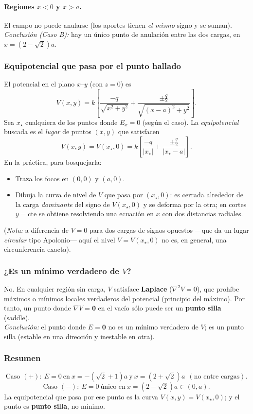 \documentclass{article}
\begin{document}
\paragraph{Regiones $x<0$ y $x>a$.} El campo no puede anularse (los aportes tienen \emph{el mismo} signo y se suman).\\[2pt]
\emph{Conclusión (Caso B):} hay un único punto de anulación entre las dos cargas, en $x=(2-\sqrt{2})a$.

\subsubsection*{Equipotencial que pasa por el punto hallado}
El potencial en el plano $x$–$y$ (con $z=0$) es
\[
V(x,y)=k\left[\frac{-q}{\sqrt{x^2+y^2}}+\frac{\pm \tfrac{q}{2}}{\sqrt{(x-a)^2+y^2}}\right].
\]
Sea $x_\star$ cualquiera de los puntos donde $E_x=0$ (según el caso). La \emph{equipotencial} buscada es el \emph{lugar} de puntos $(x,y)$ que satisfacen
\[
V(x,y)=V(x_\star,0)
= k\left[\frac{-q}{|x_\star|}+\frac{\pm \tfrac{q}{2}}{|x_\star-a|}\right].
\]
En la práctica, para bosquejarla:
\begin{itemize}
\item Traza los focos en $(0,0)$ y $(a,0)$.
\item Dibuja la curva de nivel de $V$ que pasa por $(x_\star,0)$: es cerrada alrededor de la carga \emph{dominante} del signo de $V(x_\star,0)$ y se deforma por la otra; en cortes $y=\text{cte}$ se obtiene resolviendo una ecuación en $x$ con dos distancias radiales.
\end{itemize}
(\emph{Nota:} a diferencia de $V=0$ para dos cargas de signos opuestos —que da un lugar \emph{circular} tipo Apolonio— aquí el nivel $V=V(x_\star,0)$ no es, en general, una circunferencia exacta).

\subsubsection*{¿Es un mínimo verdadero de $V$?}
No. En cualquier región sin carga, $V$ satisface \textbf{Laplace} ($\nabla^2 V=0$), que prohíbe máximos o mínimos locales verdaderos del potencial (principio del máximo). Por tanto, un punto donde $\nabla V=\mathbf 0$ en el vacío sólo puede ser un \textbf{punto silla} (saddle).\\[2pt]
\emph{Conclusión:} el punto donde $E=\mathbf 0$ no es un mínimo verdadero de $V$; es un punto silla (estable en una dirección y inestable en otra).

\subsubsection*{Resumen}
\[
\boxed{\text{Caso }(+):\ E=0\ \text{en}\ x=-(\sqrt{2}+1)a\ \text{y}\ x=(2+\sqrt{2})a\ \ (\text{no entre cargas}).}
\]
\[
\boxed{\text{Caso }(-):\ E=0\ \text{único en}\ x=(2-\sqrt{2})a\in(0,a).}
\]
La equipotencial que pasa por ese punto es la curva $V(x,y)=V(x_\star,0)$; y el punto es \textbf{punto silla}, no mínimo.
\end{document}
